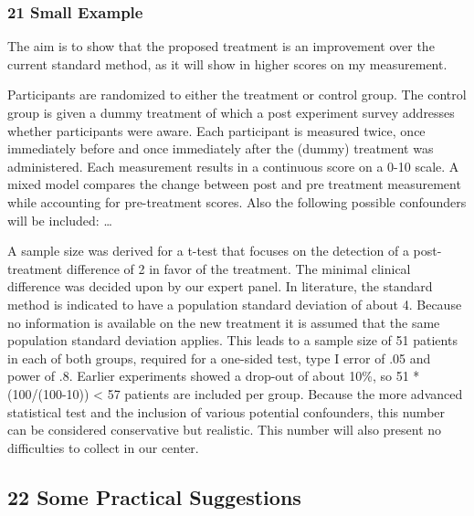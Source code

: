\documentclass[
]{article}
\begin{document}
\hypertarget{small-example}{%
\subsubsection{21 Small Example}\label{small-example}}

The aim is to show that the proposed treatment is an improvement over
the current standard method, as it will show in higher scores on my
measurement.

Participants are randomized to either the treatment or control group.
The control group is given a dummy treatment of which a post experiment
survey addresses whether participants were aware. Each participant is
measured twice, once immediately before and once immediately after the
(dummy) treatment was administered. Each measurement results in a
continuous score on a 0-10 scale. A mixed model compares the change
between post and pre treatment measurement while accounting for
pre-treatment scores. Also the following possible confounders will be
included: \ldots{}

A sample size was derived for a t-test that focuses on the detection of
a post-treatment difference of 2 in favor of the treatment. The minimal
clinical difference was decided upon by our expert panel. In literature,
the standard method is indicated to have a population standard deviation
of about 4. Because no information is available on the new treatment it
is assumed that the same population standard deviation applies. This
leads to a sample size of 51 patients in each of both groups, required
for a one-sided test, type I error of .05 and power of .8. Earlier
experiments showed a drop-out of about 10\%, so 51 * (100/(100-10))
\textless{} 57 patients are included per group. Because the more
advanced statistical test and the inclusion of various potential
confounders, this number can be considered conservative but realistic.
This number will also present no difficulties to collect in our center.

\hypertarget{some-practical-suggestions}{%
\subsection{22 Some Practical
Suggestions}\label{some-practical-suggestions}}
\end{document}
